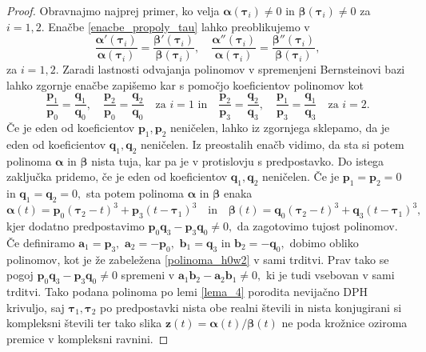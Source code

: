\documentclass[12pt,a4paper,twoside]{article}
\theoremstyle{definition} %
\theoremstyle{plain} %
\theoremstyle{primerstyle}
\numberwithin{equation}{section}  %
\newcommand{\aV}{\mathbf{a}}
\newcommand{\bV}{\mathbf{b}}
\newcommand{\pV}{\mathbf{p}}
\newcommand{\qV}{\mathbf{q}}
\newcommand{\zV}{\mathbf{z}}
\newcommand{\balpha}{\boldsymbol \alpha}
\newcommand{\bbeta}{\boldsymbol \beta}
\newcommand{\btau}{\boldsymbol \tau}
\begin{document}
\begin{proof}
	Obravnajmo najprej primer, ko velja $\balpha(\btau_i)\neq0$ in $\bbeta(\btau_i)\neq0$ za $i=1,2.$ Enačbe \eqref{enacbe_propoly_tau} lahko preoblikujemo v
	\begin{equation*}
		\frac{\balpha'(\btau_i)}{\balpha(\btau_i)}=\frac{\bbeta'(\btau_i)}{\bbeta(\btau_i)},\quad\frac{\balpha''(\btau_i)}{\balpha(\btau_i)}=\frac{\bbeta''(\btau_i)}{\bbeta(\btau_i)},
	\end{equation*}
	za $i=1,2.$ Zaradi lastnosti odvajanja polinomov v spremenjeni Bernsteinovi bazi lahko zgornje enačbe zapišemo kar s pomočjo koeficientov polinomov kot
	\begin{equation*}
		\frac{\pV_1}{\pV_0}=\frac{\qV_1}{\qV_0},\quad\frac{\pV_2}{\pV_0}=\frac{\qV_2}{\qV_0}\quad\text{za }i=1\text{  in}\quad\frac{\pV_2}{\pV_3}=\frac{\qV_2}{\qV_3},\quad\frac{\pV_1}{\pV_3}=\frac{\qV_1}{\qV_3}\quad\text{za }i=2.
	\end{equation*}
	Če je eden od koeficientov $\pV_1,\pV_2$ neničelen, lahko iz zgornjega sklepamo, da je eden od koeficientov $\qV_1,\qV_2$ neničelen. Iz preostalih enačb vidimo, da sta si potem polinoma $\balpha$ in $\bbeta$ nista tuja, kar pa je v protislovju s predpostavko. Do istega zaključka pridemo, če je eden od koeficientov $\qV_1,\qV_2$ neničelen. Če je $\pV_1=\pV_2=0$ in $\qV_1=\qV_2=0,$ sta potem polinoma $\balpha$ in $\bbeta$ enaka
	\begin{equation*}
		\balpha(t)=\pV_0(\btau_2-t)^3+\pV_3(t-\btau_1)^3\quad\text{in}\quad\bbeta(t)=\qV_0(\btau_2-t)^3+\qV_3(t-\btau_1)^3,
	\end{equation*}
	kjer dodatno predpostavimo $\pV_0\qV_3-\pV_3\qV_0\neq0,$ da zagotovimo tujost polinomov. Če definiramo $\aV_1=\pV_3,$ $\aV_2=-\pV_0,$ $\bV_1=\qV_3$ in $\bV_2=-\qV_0,$ dobimo obliko polinomov, kot je že zabeležena \eqref{polinoma_h0w2} v sami trditvi. Prav tako se pogoj $\pV_0\qV_3-\pV_3\qV_0\neq0$ spremeni v $\aV_1\bV_2-\aV_2\bV_1\neq0,$ ki je tudi vsebovan v sami trditvi. Tako podana polinoma po lemi \ref{lema_4} porodita nevijačno DPH krivuljo, saj $\btau_1,\btau_2$ po predpostavki nista obe realni števili in nista konjugirani si kompleksni števili ter tako slika $\zV(t)=\balpha(t)/\bbeta(t)$ ne poda krožnice oziroma premice v kompleksni ravnini.
	

\end{proof}
\end{document}
